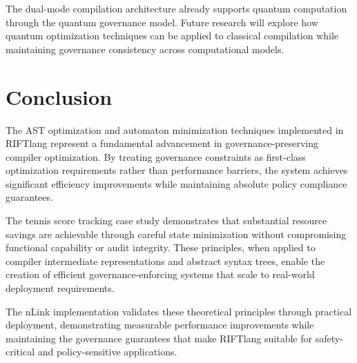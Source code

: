The dual-mode compilation architecture already supports quantum computation through the quantum governance model. Future research will explore how quantum optimization techniques can be applied to classical compilation while maintaining governance consistency across computational models.

\section*{Conclusion}

The AST optimization and automaton minimization techniques implemented in RIFTlang represent a fundamental advancement in governance-preserving compiler optimization. By treating governance constraints as first-class optimization requirements rather than performance barriers, the system achieves significant efficiency improvements while maintaining absolute policy compliance guarantees.

The tennis score tracking case study demonstrates that substantial resource savings are achievable through careful state minimization without compromising functional capability or audit integrity. These principles, when applied to compiler intermediate representations and abstract syntax trees, enable the creation of efficient governance-enforcing systems that scale to real-world deployment requirements.

The nLink implementation validates these theoretical principles through practical deployment, demonstrating measurable performance improvements while maintaining the governance guarantees that make RIFTlang suitable for safety-critical and policy-sensitive applications.